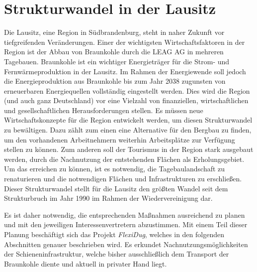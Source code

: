 \section{Strukturwandel in der Lausitz}

Die Lausitz, eine Region in Südbrandenburg, steht in naher Zukunft vor tiefgreifenden Veränderungen. Einer der wichtigsten Wirtschaftsfaktoren in der Region ist der Abbau von Braunkohle durch die LEAG AG in mehreren Tagebauen. Braunkohle ist ein wichtiger Energieträger für die Strom- und Fernwärmeproduktion in der Lausitz. Im Rahmen der Energiewende soll jedoch die Energieproduktion aus Braunkohle bis zum Jahr 2038 zugunsten von erneuerbaren Energiequellen vollständig eingestellt werden. Dies wird die Region (und auch ganz Deutschland) vor eine Vielzahl von finanziellen, wirtschaftlichen und gesellschaftlichen Herausforderungen stellen. Es müssen neue Wirtschaftskonzepte für die Region entwickelt werden, um diesen Strukturwandel zu bewältigen. Dazu zählt zum einen eine Alternative für den Bergbau zu finden, um den vorhandenen Arbeitnehmern weiterhin Arbeitsplätze zur Verfügung stellen zu können. Zum anderen soll der Tourismus in der Region stark ausgebaut werden, durch die Nachnutzung der entstehenden Flächen als Erholungsgebiet. Um das erreichen zu können, ist es notwendig, die Tagebaulandschaft zu renaturieren\cite{btu_flexidug_2022} und die notwendigen Flächen und Infrastrukturen zu erschließen. Dieser Strukturwandel stellt für die Lausitz den größten Wandel seit dem Strukturbruch im Jahr 1990 im Rahmen der Wiedervereinigung dar.

Es ist daher notwendig, die entsprechenden Maßnahmen ausreichend zu planen und mit den jeweiligen Interessenvertretern abzustimmen. Mit einem Teil dieser Planung beschäftigt sich das Projekt \emph{FlexiDug}, welches in den folgenden Abschnitten genauer beschrieben wird. Es erkundet Nachnutzungsmöglichkeiten der Schieneninfrastruktur, welche bisher ausschließlich dem Transport der Braunkohle diente und aktuell in privater Hand liegt.